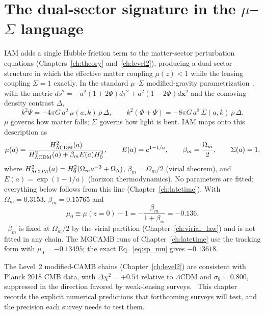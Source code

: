 \section{The dual-sector signature in the $\mu$--$\Sigma$ language}\label{sec:sp_mapping}
IAM adds a single Hubble friction term to the matter-sector perturbation equations (Chapters~\ref{ch:theory} and~\ref{ch:level2}), producing a
dual-sector structure in which the effective matter coupling $\mu(z)<1$ while the lensing coupling $\Sigma=1$ exactly. In the standard $\mu$--$\Sigma$
modified-gravity parametrization~\cite{PogosianSilvestri2016}, with the metric
$ds^2=-a^2(1+2\Psi)d\tau^2+a^2(1-2\Phi)d\mathbf{x}^2$ and the comoving density contrast $\Delta$,
\begin{equation}k^2\Psi=-4\pi G\,a^2\,\mu(a,k)\,\bar\rho\,\Delta,\qquad k^2(\Phi+\Psi)=-8\pi G\,a^2\,\Sigma(a,k)\,\bar\rho\,\Delta .\label{eq:sp_poisson}\end{equation}
$\mu$ governs how matter falls; $\Sigma$ governs how light is bent. IAM maps onto this description as
\begin{equation}
\mu(a)=\frac{H^2_{\Lambda\rm CDM}(a)}{H^2_{\Lambda\rm CDM}(a)+\beta_mE(a)H_0^2},\qquad E(a)=e^{1-1/a},\qquad\beta_m=\frac{\Omega_m}{2},\qquad\Sigma(a)=1,
\label{eq:sp_mu}\end{equation}
where $H^2_{\Lambda\rm CDM}(a)=H_0^2(\Omega_ma^{-3}+\Omega_\Lambda)$, $\beta_m=\Omega_m/2$ (virial theorem), and $E(a)=\exp(1-1/a)$ (horizon
thermodynamics). No parameters are fitted; everything below follows from this line (Chapter~\ref{ch:latetime}). With $\Omega_m=0.3153$, $\beta_m=0.15765$ and
\begin{equation}\mu_0\equiv\mu(z{=}0)-1=-\frac{\beta_m}{1+\beta_m}=-0.136 .\label{eq:sp_mu0}\end{equation}
\prediction\ $\beta_m$ is fixed at $\Omega_m/2$ by the virial partition (Chapter~\ref{ch:virial_law}) and is not fitted in any chain. The MGCAMB runs of
Chapter~\ref{ch:latetime} use the tracking form with $\mu_0=-0.13495$; the exact Eq.~\eqref{eq:sp_mu} gives $-0.13618$. \calc

The Level~2 modified-CAMB chains (Chapter~\ref{ch:level2}) are consistent with Planck 2018 CMB data, with $\Delta\chi^2=+0.54$ relative to
$\Lambda$CDM and $\sigma_8=0.800$, suppressed in the direction favored by weak-lensing surveys. \measured\ This chapter records the explicit
numerical predictions that forthcoming surveys will test, and the precision each survey needs to test them.

